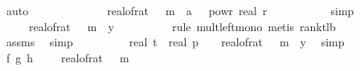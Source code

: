 \begin{isabellebody}
\ auto\isanewline
\ \ \ \ \ \ \isamarkupfalse%
\ \isamarkupfalse%
\ {\isachardoublequoteopen}{\isachardot}{\kern0pt}{\isachardot}{\kern0pt}{\isachardot}{\kern0pt}\ {\isacharequal}{\kern0pt}\ {\isacharparenleft}{\kern0pt}{}\ {\isacharplus}{\kern0pt}\ real{\isacharunderscore}{\kern0pt}of{\isacharunderscore}{\kern0pt}rat\ {\isasymdelta}{\isacharparenright}{\kern0pt}\ {\isacharasterisk}{\kern0pt}\ m\ {\isacharasterisk}{\kern0pt}\ {\isacharparenleft}{\kern0pt}{\isacharparenleft}{\kern0pt}a{\isacharplus}{\kern0pt}{}{\isacharparenright}{\kern0pt}\ {\isacharasterisk}{\kern0pt}\ {\isacharparenleft}{\kern0pt}{}{\isacharminus}{\kern0pt}{}\ powr\ {\isacharparenleft}{\kern0pt}{\isacharminus}{\kern0pt}real\ r{\isacharparenright}{\kern0pt}{\isacharparenright}{\kern0pt}{\isacharparenright}{\kern0pt}{\isachardoublequoteclose}\ \isanewline
\ \ \ \ \ \ \ \ \isamarkupfalse%
\ simp\isanewline
\ \ \ \ \ \ \isamarkupfalse%
\ \isamarkupfalse%
\ {\isachardoublequoteopen}{\isachardot}{\kern0pt}{\isachardot}{\kern0pt}{\isachardot}{\kern0pt}\ {\isasymle}\ {\isacharparenleft}{\kern0pt}{}\ {\isacharplus}{\kern0pt}\ real{\isacharunderscore}{\kern0pt}of{\isacharunderscore}{\kern0pt}rat\ {\isasymdelta}{\isacharparenright}{\kern0pt}\ {\isacharasterisk}{\kern0pt}\ m\ {\isacharasterisk}{\kern0pt}\ y{\isacharprime}{\kern0pt}{\isachardoublequoteclose}\isanewline
\ \ \ \ \ \ \ \ \isamarkupfalse%
\ {\isacharparenleft}{\kern0pt}rule\ mult{\isacharunderscore}{\kern0pt}left{\isacharunderscore}{\kern0pt}mono{\isacharcomma}{\kern0pt}\ metis\ rank{\isacharunderscore}{\kern0pt}t{\isacharunderscore}{\kern0pt}lb{\isacharprime}{\kern0pt}{\isacharparenright}{\kern0pt}\isanewline
\ \ \ \ \ \ \ \ \isamarkupfalse%
\ assms\ \isamarkupfalse%
\ simp\isanewline
\ \ \ \ \ \ \isamarkupfalse%
\ \isamarkupfalse%
\ {\isachardoublequoteopen}real\ t\ {\isacharasterisk}{\kern0pt}\ real\ p\ {\isacharless}{\kern0pt}\ {\isacharparenleft}{\kern0pt}{}\ {\isacharplus}{\kern0pt}\ real{\isacharunderscore}{\kern0pt}of{\isacharunderscore}{\kern0pt}rat\ {\isasymdelta}{\isacharparenright}{\kern0pt}\ {\isacharasterisk}{\kern0pt}\ m\ {\isacharasterisk}{\kern0pt}\ y{\isacharprime}{\kern0pt}{\isachardoublequoteclose}\ \isamarkupfalse%
\ simp\isanewline
\ \ \ \ \ \ \isamarkupfalse%
\ f{\isacharunderscore}{\kern0pt}{}{\isacharcolon}{\kern0pt}\ {\isachardoublequoteopen}g{\isacharprime}{\kern0pt}\ {\isacharparenleft}{\kern0pt}h\ {\isasymomega}{\isacharparenright}{\kern0pt}\ {\isacharless}{\kern0pt}\ {\isacharparenleft}{\kern0pt}{}\ {\isacharplus}{\kern0pt}\ real{\isacharunderscore}{\kern0pt}of{\isacharunderscore}{\kern0pt}rat\ {\isasymdelta}{\isacharparenright}{\kern0pt}\ {\isacharasterisk}{\kern0pt}\ m{\isachardoublequoteclose}\isanewline

\end{isabellebody}
